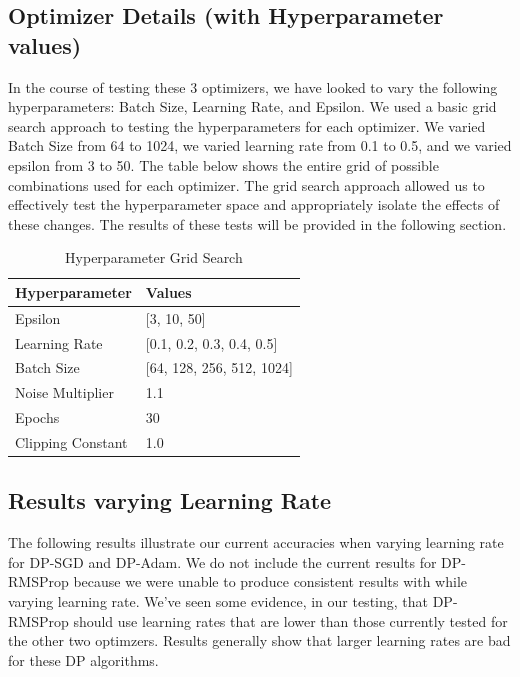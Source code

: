 \subsection{Optimizer Details (with Hyperparameter values)}\label{subsec:optimizer-details}
In the course of testing these 3 optimizers, we have looked to vary the following hyperparameters: Batch Size, Learning Rate, and Epsilon. We used a basic grid search
approach to testing the hyperparameters for each optimizer. We varied Batch Size from 64 to 1024, we varied learning rate from 0.1 to 0.5, and we varied epsilon from 3 to 50. The
table below shows the entire grid of possible combinations used for each optimizer. The grid search approach allowed us to effectively test the hyperparameter space and appropriately
isolate the effects of these changes. The results of these tests will be provided in the following section.

\begin{table}[h]
    \centering
    \caption{Hyperparameter Grid Search}
    \begin{tabular}{@{}ll@{}}
        \toprule
        \textbf{Hyperparameter}       & \textbf{Values}                           \\ \midrule
        Epsilon                       & [3, 10, 50]                              \\
        Learning Rate                 & [0.1, 0.2, 0.3, 0.4, 0.5]               \\
        Batch Size                    & [64, 128, 256, 512, 1024]                \\
        Noise Multiplier              & 1.1                                       \\
        Epochs                        & 30                                        \\
        Clipping Constant             & 1.0                                       \\ \bottomrule
    \end{tabular}
    \label{tab:hyperparameters}
\end{table}
\break

\subsection{Results varying Learning Rate}\label{subsec:dp-details}
The following results illustrate our current accuracies when varying learning rate for DP-SGD and DP-Adam. We
do not include the current results for DP-RMSProp because we were unable to produce consistent results with while 
varying learning rate. We've seen some evidence, in our testing, that DP-RMSProp should use learning rates that are lower
than those currently tested for the other two optimzers. Results generally show that larger learning rates are bad
for these DP algorithms.

